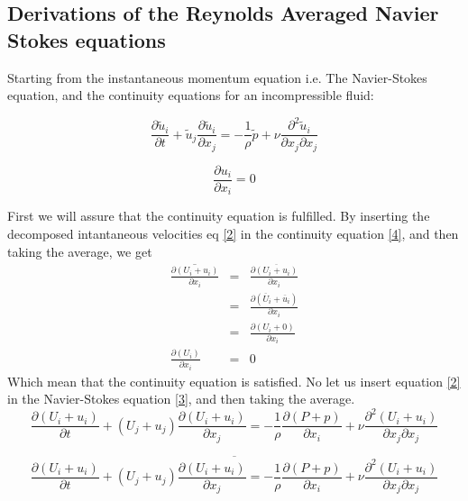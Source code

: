 \documentclass[11pt]{article}
\begin{document}
{%
\subsection{Derivations of the Reynolds Averaged Navier Stokes equations}

Starting from the instantaneous momentum equation i.e. The Navier-Stokes
equation, and the continuity equations for an incompressible fluid:

\begin{equation}
\label{3}
\frac{\partial\widetilde{u}_{i}}{\partial t}+\tilde{u}_{j}\frac{\partial\widetilde{u}_{i}}{\partial x_{j}}
=-\frac{1}{\rho}\tilde{p}+\nu\frac{\partial^{2}\tilde{u}_{i}}{\partial x_{j}\partial x_{j}}
\end{equation}


\begin{equation}
\label{4}
\frac{\partial u_{i}}{\partial x_{i}}=0
\end{equation}

First we will assure that the continuity equation is fulfilled. By
inserting the decomposed intantaneous velocities eq \eqref{2} in the continuity
equation \eqref{4}, and then taking the average, we get 
\begin{eqnarray}
\label{5}
\overline{\frac{\partial(U_{i}+u_{i})}{\partial x_{i}}} & = & \frac{\partial\overline{(U_{i}+u_{i})}}{\partial x_{i}}\nonumber \\
 & = & \frac{\partial(\overline{U}_{i}+\overline{u}_{i})}{\partial x_{i}}\nonumber \\
 & = & \frac{\partial(U_{i}+0)}{\partial x_{i}}\nonumber \\
\frac{\partial(U_{i})}{\partial x_{i}} & = & 0
\end{eqnarray}
Which mean that the continuity equation is satisfied. No let us insert
equation \eqref{2} in the Navier-Stokes equation \eqref{3}, and then taking the
average. 
\begin{equation}
\label{6}
\frac{\partial(U_{i}+u_{i})}{\partial t}+(U_{j}+u_{j})\frac{\partial(U_{i}+u_{i})}{\partial x_{j}}
=-\frac{1}{\rho}\frac{\partial(P+p)}{\partial x_{i}}+\nu\frac{\partial^{2}(U_{i}+u_{i})}{\partial x_{j}\partial x_{j}}
\end{equation}

\[
\overline{\frac{\partial(U_{i}+u_{i})}{\partial t}+(U_{j}+u_{j})\frac{\partial(U_{i}+u_{i})}{\partial x_{j}}
=-\frac{1}{\rho}\frac{\partial(P+p)}{\partial x_{i}}+\nu\frac{\partial^{2}(U_{i}+u_{i})}{\partial x_{j}\partial x_{j}}}
\]


}
\end{document}
